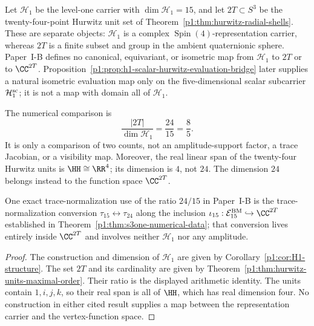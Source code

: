 \documentclass[11pt]{article}
\begin{document}
\begin{proposition}
\label{p1:prop:scalar-shell-visibility-lift}
Let \(\mathcal H_1\) be the level-one carrier with
\(\dim\mathcal H_1=15\), and let \(2T\subset S^3\) be the
twenty-four-point Hurwitz unit set of
Theorem~\ref{p1:thm:hurwitz-radial-shells}.  These are separate objects:
\(\mathcal H_1\) is a complex \(\operatorname{Spin}(4)\)-representation carrier, whereas
\(2T\) is a finite subset and group in the ambient quaternionic sphere.
Paper~I-B defines no canonical, equivariant, or isometric map from
\(\mathcal H_1\) to \(2T\) or to \(\CC^{2T}\).
Proposition~\ref{p1:prop:h1-scalar-hurwitz-evaluation-bridge} later supplies
a natural isometric evaluation map only on the five-dimensional scalar
subcarrier \(\mathcal H_1^{\rm sc}\); it is not a map with domain all of
\(\mathcal H_1\).

The numerical comparison is
\[
\frac{|2T|}{\dim\mathcal H_1}=\frac{24}{15}=\frac{8}{5}.
\]
It is only a comparison of two counts, not an
amplitude-support factor, a trace Jacobian, or a visibility map.  Moreover,
the real linear span of the twenty-four Hurwitz units is \(\HH\cong\RR^4\);
its dimension is \(4\), not \(24\).  The dimension \(24\) belongs instead to
the function space \(\CC^{2T}\).

One exact trace-normalization use of the ratio \(24/15\) in Paper~I-B is the
trace-normalization conversion \(\tau_{15}\leftrightarrow\tau_{24}\) along
the inclusion \(\iota_{15}:\mathcal E_{15}^{\rm BM}\hookrightarrow\CC^{2T}\) established
in Theorem~\ref{p1:thm:s3one-numerical-data}; that conversion lives entirely
inside \(\CC^{2T}\) and involves neither \(\mathcal H_1\) nor any
amplitude.
\end{proposition}

\begin{proof}
The construction and dimension of \(\mathcal H_1\) are given by
Corollary~\ref{p1:cor:H1-structure}.  The set \(2T\) and its cardinality are
given by Theorem~\ref{p1:thm:hurwitz-units-maximal-order}.  Their ratio is
the displayed arithmetic identity.  The units contain
\(1,i,j,k\), so their real span is all of \(\HH\), which has real dimension
four.  No construction in either cited result supplies a map between the
representation carrier and the vertex-function space.
\end{proof}
\end{document}
